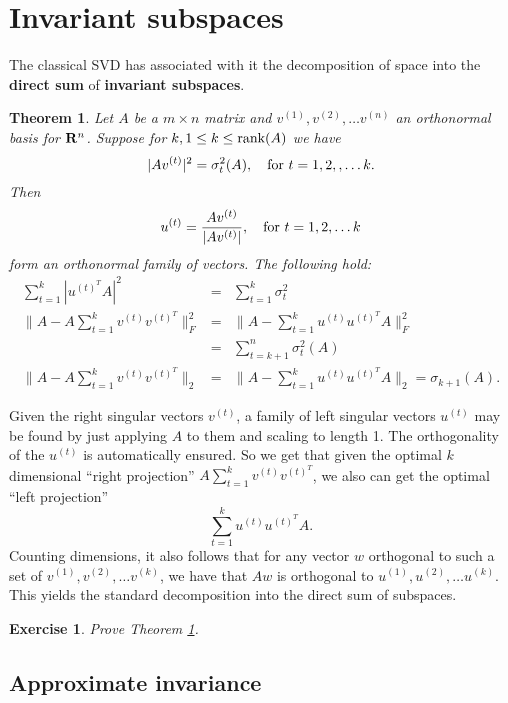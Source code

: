 \documentclass{book}
\newtheorem{theorem}{Theorem}[chapter]
\newtheorem{exercise}{Exercise}
\numberwithin{exercise}{chapter}
\begin{document}
\section{Invariant subspaces}

The classical SVD has associated with it the decomposition of space into the {\bf direct sum}
of {\bf invariant subspaces}.


\begin{theorem} \label{invariant}
Let $A$ be a $m\times n$ matrix and $v^{(1)},v^{(2)},\ldots v^{(n)}$ an
orthonormal basis for ${\bf R}^n$. Suppose for $k, 1\leq k\leq \hbox{rank}(A)$ we have
$$ |Av^{(t)}|^2=\sigma_t^2(A),\quad\hbox{for } t=1,2,,\ldots k.$$
Then $$u^{(t)}={Av^{(t)}\over |Av^{(t)}|},\quad\hbox{for } t=1,2,\ldots k$$
form an orthonormal
family of vectors. The following hold:
\begin{eqnarray*}
\sum_{t=1}^k |u^{(t)^T}A|^2&=&\sum_{t=1}^k\sigma_t^2\\
\|A-A\sum_{t=1}^kv^{(t)}v^{(t)^T}\|_F^2 &=& \|A-\sum_{t=1}^ku^{(t)}u^{(t)^T}A\|_F^2\\
&=&\sum_{t=k+1}^n\sigma_t^2(A)\\
\|A-A\sum_{t=1}^kv^{(t)}v^{(t)^T}\|_2 &=& \|A-\sum_{t=1}^ku^{(t)}u^{(t)^T}A\|_2=\sigma_{k+1}(A).
\end{eqnarray*}
\end{theorem}

Given the right singular vectors $v^{(t)}$, a family of left singular vectors
$u^{(t)}$ may be found by just applying $A$ to them and scaling to length 1. The
orthogonality of the $u^{(t)}$ is automatically ensured. So we get that given the optimal
$k$ dimensional ``right projection'' $A\sum_{t=1}^k v^{(t)}v^{(t)^T}$, we also can get the
optimal ``left projection'' $$\sum_{t=1}^k u^{(t)}u^{(t)^T}A.$$
Counting dimensions, it also
follows that for any vector $w$ orthogonal to such a set of $v^{(1)},v^{(2)},\ldots v^{(k)}$,
we have that $Aw$ is orthogonal to $u^{(1)},u^{(2)},\ldots u^{(k)}$. This yields the standard decomposition into the direct sum of subspaces.

\begin{exercise}
Prove Theorem \ref{invariant}.
\end{exercise}

\subsection{Approximate invariance}
\end{document}
